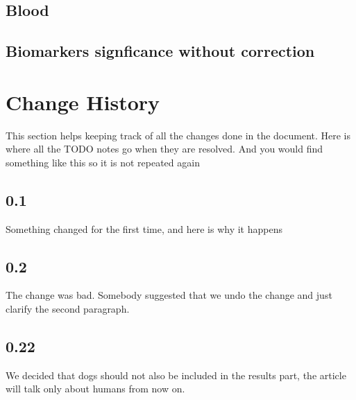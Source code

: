 \documentclass[10pt, a4paper, onecolumn]{article} %
\begin{document}
\subsection{Blood}
\label{supplementaryBlood}




\subsection{Biomarkers signficance without correction}
\label{biomarkersSimplePvalues}










\newpage

\twocolumn

\section{Change History}

This section helps keeping track of all the changes done in the document. Here is where all the TODO notes go when they are resolved. And you would find something like this so it is not repeated again\\

\subsection*{0.1}

Something changed for the first time, and here is why it happens

\subsection*{0.2}

The change was bad. Somebody suggested that we undo the change and just clarify the second paragraph.

\subsection*{0.22}

We decided that dogs should not also be included in the results part, the article will talk only about humans from now on.
\end{document}
